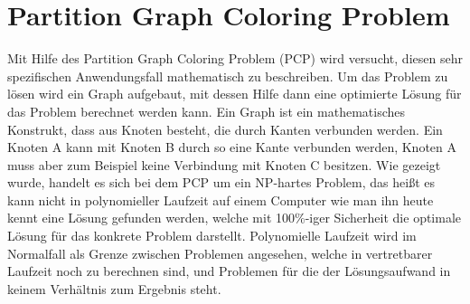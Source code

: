 \section{Partition Graph Coloring Problem}
Mit Hilfe des Partition Graph Coloring Problem (PCP) wird versucht, diesen sehr spezifischen Anwendungsfall mathematisch zu beschreiben. Um das Problem zu lösen wird
ein Graph aufgebaut, mit dessen Hilfe dann eine optimierte Lösung für das Problem berechnet werden kann. Ein Graph ist ein mathematisches Konstrukt, dass aus Knoten
besteht, die durch Kanten verbunden werden. Ein Knoten A kann mit Knoten B durch so eine Kante verbunden werden, Knoten A muss aber zum Beispiel keine Verbindung mit
Knoten C besitzen. Wie gezeigt wurde, handelt es sich bei dem PCP um ein NP-hartes Problem, das heißt es kann nicht in polynomieller Laufzeit auf einem Computer
wie man ihn heute kennt eine Lösung gefunden werden, welche mit 100\%-iger Sicherheit die optimale Lösung für das konkrete Problem darstellt. Polynomielle Laufzeit
wird im Normalfall als Grenze zwischen Problemen angesehen, welche in vertretbarer Laufzeit noch zu berechnen sind, und Problemen für die der Lösungsaufwand in
keinem Verhältnis zum Ergebnis steht.

